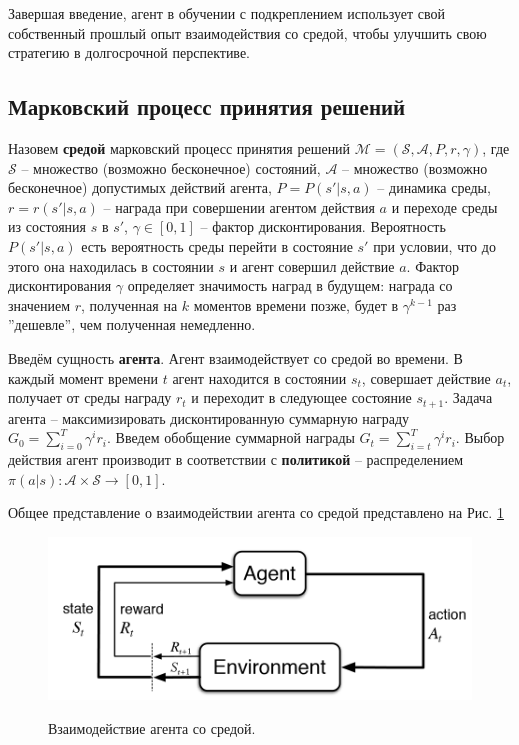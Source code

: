 \documentclass[12pt,a4paper]{amsart}
\begin{document}
Завершая введение, агент в обучении с подкреплением использует свой собственный прошлый опыт взаимодействия со средой, чтобы улучшить свою стратегию в долгосрочной перспективе.

\subsection{Марковский процесс принятия решений}


Назовем \textbf{средой} марковский процесс принятия решений $\mathcal{M} = (\mathcal{S}, \mathcal{A}, P, r, \gamma)$, где $\mathcal{S}$ -- множество (возможно бесконечное) состояний, $\mathcal{A}$ -- множество (возможно бесконечное) допустимых действий агента, $P = P(s' | s,a)$ -- динамика среды, $r = r(s' | s, a)$ -- награда при совершении агентом действия $a$ и переходе среды из состояния $s$ в $s'$, $\gamma \in [0, 1]$ -- фактор дисконтирования. Вероятность $P(s' | s,a)$ есть вероятность среды перейти в состояние $s'$ при условии, что до этого она находилась в состоянии $s$ и агент совершил действие $a$. Фактор дисконтирования $\gamma$ определяет значимость наград в будущем: награда со значением $r$, полученная на $k$ моментов времени позже, будет в $\gamma^{k-1}$ раз ''дешевле'', чем полученная немедленно.

Введём сущность \textbf{агента}. Агент взаимодействует со средой во времени. В каждый момент времени $t$ агент находится в состоянии $s_t$, совершает действие $a_t$, получает от среды награду $r_t$ и переходит в следующее состояние $s_{t+1}$. Задача агента -- максимизировать дисконтированную суммарную награду $G_0 = \sum_{i=0}^{T}\gamma^i r_i$. Введем обобщение суммарной награды $G_t = \sum_{i=t}^{T}\gamma^i r_i$. Выбор действия агент производит в соответствии с \textbf{политикой} -- распределением $\pi(a|s) : \mathcal{A} \times \mathcal{S} \rightarrow [0, 1]$.

Общее представление о взаимодействии агента со средой представлено на Рис. \ref{fig:rl-overview}

\begin{figure}[htbp!]
	\caption{Взаимодействие агента со средой.}
	\includegraphics[width=\textwidth]{imgs/rl_overview2.png}
	\label{fig:rl-overview}
	\centering
\end{figure}
\end{document}
